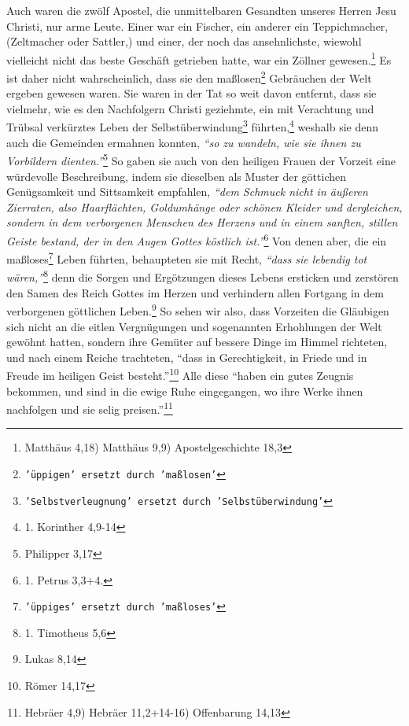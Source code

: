 Auch waren die zwölf Apostel, die unmittelbaren
Gesandten unseres Herren Jesu
Christi, nur arme Leute. Einer war ein Fischer, ein
anderer ein
Teppichmacher,
(Zeltmacher oder Sattler,) und einer, der noch das ansehnlichste, wiewohl
vielleicht nicht das beste Geschäft getrieben hatte, war ein
Zöllner
gewesen.\footnote{Matthäus 4,18) Matthäus 9,9) Apostelgeschichte 18,3}
Es ist daher nicht wahrscheinlich, dass sie den
maßlosen\footnote{\texttt{'üppigen' ersetzt
durch 'maßlosen'}} Gebräuchen der Welt ergeben
gewesen waren. Sie waren in der Tat so weit davon entfernt, dass sie vielmehr,
wie es den Nachfolgern Christi geziehmte, ein mit Verachtung und Trübsal
verkürztes Leben der Selbstüberwindung\footnote{\texttt{'Selbstverleugnung'
ersetzt durch
'Selbstüberwindung'}} führten,\footnote{1. Korinther 4,9-14}
weshalb sie denn auch die Gemeinden ermahnen konnten,
\textit{"`so zu wandeln, wie sie ihnen zu Vorbildern
dienten."'}\footnote{Philipper 3,17}
So gaben sie auch von den heiligen
Frauen der
Vorzeit
eine würdevolle Beschreibung, indem sie dieselben als Muster
der göttichen Genügsamkeit und Sittsamkeit empfahlen,
\textit{"`dem Schmuck nicht in
äußeren Zierraten, also Haarflächten, Goldumhänge oder schönen Kleider und
dergleichen,
sondern in dem verborgenen Menschen des Herzens und in einem sanften, stillen
Geiste bestand, der in den Augen Gottes köstlich ist."'}\footnote{1. Petrus
3,3+4.}
Von denen aber, die ein maßloses\footnote{\texttt{'üppiges' ersetzt durch
'maßloses'}} Leben
führten, behaupteten sie mit Recht,
\textit{"`dass sie lebendig tot wären,"'}\footnote{1.
Timotheus 5,6}
denn die Sorgen und
Ergötzungen dieses Lebens ersticken und zerstören den Samen des Reich
Gottes im
Herzen und verhindern allen Fortgang in dem verborgenen göttlichen
Leben.\footnote{Lukas 8,14}
So sehen wir also, dass Vorzeiten die Gläubigen sich
nicht an die eitlen Vergnügungen und sogenannten Erhohlungen der Welt gewöhnt
hatten, sondern ihre Gemüter auf bessere Dinge im Himmel
richteten, und nach
einem Reiche trachteten,
"`dass in Gerechtigkeit, in Friede und in Freude im
heiligen Geist besteht."'\footnote{Römer 14,17}
Alle diese
"`haben ein gutes
Zeugnis bekommen, und sind in die ewige Ruhe eingegangen, wo ihre Werke ihnen
nachfolgen und sie selig preisen."'\footnote{Hebräer 4,9) Hebräer
11,2+14-16)
Offenbarung 14,13}


